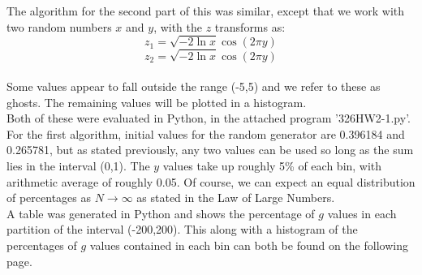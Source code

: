\documentclass[12pt]{article}
\begin{document}
The algorithm for the second part of this was similar, except that we work with two random numbers $x$ and $y$, with the $z$ transforms as:
$$z_1 = \sqrt{-2\ln x}\cos(2\pi y)$$
$$z_2 = \sqrt{-2\ln x}\cos(2\pi y)$$
\\Some values appear to fall outside the range (-5,5) and we refer to these as ghosts. The remaining values will be plotted in a histogram.
\\Both of these were evaluated in Python, in the attached program '326HW2-1.py'. For the first algorithm, initial values for the random generator are 0.396184 and 0.265781, but as stated previously, any two values can be used so long as the sum lies in the interval (0,1). The $y$ values take up roughly 5\% of each bin, with arithmetic average of roughly 0.05. Of course, we can expect an equal distribution of percentages as $N\rightarrow\infty$ as stated in the Law of Large Numbers.
\\A table was generated in Python and shows the percentage of $g$ values in each partition of the interval (-200,200). This along with a histogram of the percentages of $g$ values contained in each bin can both be found on the following page.
\end{document}
